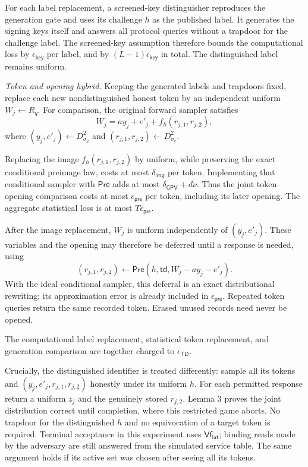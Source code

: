 \documentclass[lettersize,journal]{IEEEtran}
\begin{document}
	For each label replacement, a screened-key distinguisher reproduces
	the generation gate and uses its challenge $h$ as the published label.
	It generates the signing keys itself and answers all protocol queries
	without a trapdoor for the challenge label.
	The screened-key assumption therefore bounds the computational loss
	by $\epsilon_{\mathsf{key}}$ per label, and by
	$(L-1)\epsilon_{\mathsf{key}}$ in total.
	The distinguished label remains uniform.
	
	\emph{Token and opening hybrid.}
	Keeping the generated labels and trapdoors fixed, replace each new
	nondistinguished honest token by an independent uniform
	$W_j\leftarrow R_q$.
	For comparison, the original forward sampler satisfies
	\[
	W_j=ay_j+e'_j+f_h(r_{j,1},r_{j,2}),
	\]
	where $(y_j,e'_j)\leftarrow D_{\sigma_2}^{2}$ and
	$(r_{j,1},r_{j,2})\leftarrow D_{\sigma_r}^{2}$.
	
	Replacing the image $f_h(r_{j,1},r_{j,2})$ by uniform,
	while preserving the exact conditional preimage law,
	costs at most $\delta_{\mathsf{img}}$ per token.
	Implementing that conditional sampler with $\mathsf{Pre}$
	adds at most $\delta_{\mathsf{GPV}}+d\nu$.
	Thus the joint token--opening comparison costs at most
	$\epsilon_{\mathsf{pre}}$ per token, including its later opening.
	The aggregate statistical loss is at most
	$T\epsilon_{\mathsf{pre}}$.
	
	After the image replacement, $W_j$ is uniform independently of
	$(y_j,e'_j)$.
	These variables and the opening may therefore be deferred until
	a response is needed, using
	\[
	(r_{j,1},r_{j,2})\leftarrow
	\mathsf{Pre}(h,\mathsf{td},W_j-ay_j-e'_j).
	\]
	With the ideal conditional sampler, this deferral is an exact
	distributional rewriting; its approximation error is already
	included in $\epsilon_{\mathsf{pre}}$.
	Repeated token queries return the same recorded token.
	Erased unused records need never be opened.
	
	The computational label replacement, statistical token replacement,
	and generation comparison are together charged to
	$\epsilon_{\mathsf{TD}}$.
	
	Crucially, the distinguished identifier is treated differently: sample all
	its tokens and $(y_j,e'_j,r_{j,1},r_{j,2})$ honestly under its uniform $h$.
	For each permitted response return a uniform $z_j$ and the genuinely stored
	$r_{j,2}$. Lemma 3 proves the joint distribution correct until completion,
	where this restricted game aborts. No trapdoor for the distinguished $h$
	and no equivocation of a target token is required. Terminal
	acceptance in this experiment uses $\mathsf{Vf}_{\mathsf{lat}}$;
	binding reads made by the adversary are still answered from the
	simulated service table. The same argument holds
	if its active set was chosen after seeing all its tokens.
	
\end{document}
